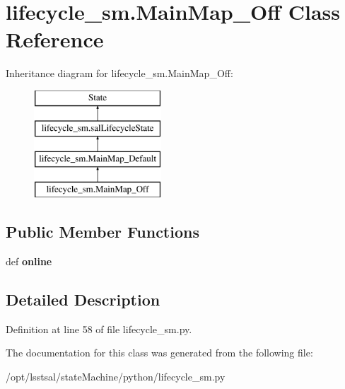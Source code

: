 \hypertarget{classlifecycle__sm_1_1_main_map___off}{\section{lifecycle\-\_\-sm.\-Main\-Map\-\_\-\-Off Class Reference}
\label{classlifecycle__sm_1_1_main_map___off}
}
Inheritance diagram for lifecycle\-\_\-sm.\-Main\-Map\-\_\-\-Off\-:\begin{figure}[H]
\begin{center}
\leavevmode
\includegraphics[height=4.000000cm]{classlifecycle__sm_1_1_main_map___off}
\end{center}
\end{figure}
\subsection*{Public Member Functions}
\begin{DoxyCompactItemize}
\item 
\hypertarget{classlifecycle__sm_1_1_main_map___off_a0db12f1af0e37df902556e60d19e0fc4}{def {\bfseries online}}\label{classlifecycle__sm_1_1_main_map___off_a0db12f1af0e37df902556e60d19e0fc4}

\end{DoxyCompactItemize}


\subsection{Detailed Description}


Definition at line 58 of file lifecycle\-\_\-sm.\-py.



The documentation for this class was generated from the following file\-:\begin{DoxyCompactItemize}
\item 
/opt/lsstsal/state\-Machine/python/lifecycle\-\_\-sm.\-py\end{DoxyCompactItemize}
